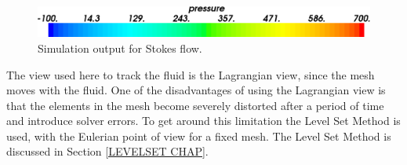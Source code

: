 \begin{figure}
\includegraphics[scale=0.25]{figures/stokes-fluid-colorbar}
\caption{Simulation output for Stokes flow.}
\label{FLUID OUTPUT2}
\end{figure}
%
The view used here to track the fluid is the Lagrangian view, since the mesh moves with the fluid. One of the disadvantages of using the Lagrangian view is that the elements in the mesh become severely distorted after a period of time and introduce solver errors. To get around this limitation the Level Set Method is used, with the Eulerian point of view for a fixed mesh. The Level Set Method is discussed in Section \ref{LEVELSET CHAP}.

